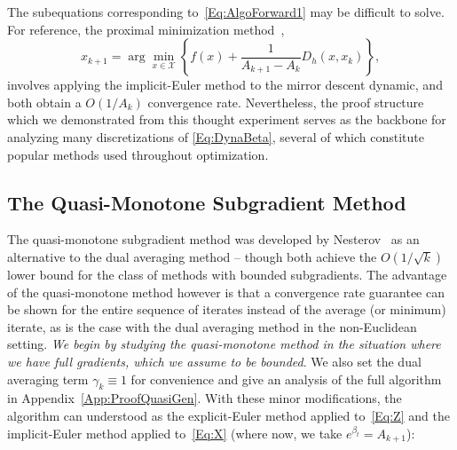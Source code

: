 \documentclass[11pt]{article}
\theoremstyle{plain}
\newcommand{\X}{{\mathcal X}}
\begin{document}
The subequations corresponding to~\eqref{Eq:AlgoForward1} may be difficult to solve. For reference, the proximal minimization method~\cite{ChenTeboulle93}, 
\begin{equation}
x_{k+1} = \arg\min_{x\in\X} \left\{ f(x) + \frac{1}{A_{k+1} - A_k}D_h\left(x, x_k\right)\right\},
\end{equation}
involves applying the implicit-Euler method to the mirror descent dynamic, and both obtain a $O(1/A_k)$ convergence rate. Nevertheless, the proof structure which we demonstrated from this thought experiment serves as the backbone for analyzing many discretizations of \eqref{Eq:DynaBeta}, several of which constitute popular methods used throughout optimization.

\subsection{The Quasi-Monotone Subgradient Method}
\label{Sec:QuasiMono}
The quasi-monotone subgradient method was developed by Nesterov~\cite{Nesterov15} as an alternative to the dual averaging method -- though both achieve the $O(1/\sqrt{k})$ lower bound for the class of methods with bounded subgradients. The advantage of the quasi-monotone method however is that a convergence rate guarantee can be shown for the entire sequence of iterates instead of the average (or minimum) iterate, as is the case with the dual averaging method in the non-Euclidean setting. {\em We begin by studying the quasi-monotone method in the situation where we have full gradients, which we assume to be bounded}. We also set the dual averaging term $\gamma_k \equiv 1$ for convenience and give an analysis of the full algorithm in Appendix~\ref{App:ProofQuasiGen}.  With these minor modifications, the algorithm can understood as the explicit-Euler method applied to~\eqref{Eq:Z} and the implicit-Euler method applied to~\eqref{Eq:X} (where now, we take $e^{\beta_t} = A_{k+1}$):
\end{document}
